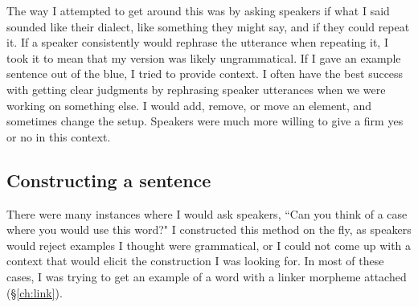 The way I attempted to get around this was by asking speakers if what I said sounded like their dialect, like something they might say, and if they could repeat it. If a speaker consistently would rephrase the utterance when repeating it, I took it to mean that my version was likely ungrammatical. If I gave an example sentence out of the blue, I tried to provide context. I often have the best success with getting clear judgments by rephrasing speaker utterances when we were working on something else. I would add, remove, or move an element, and sometimes change the setup. Speakers were much more willing to give a firm yes or no in this context.

\subsection{Constructing a sentence}

There were many instances where I would ask speakers, ``Can you think of a case where you would use this word?" I constructed this method on the fly, as speakers would reject examples I thought were grammatical, or I could not come up with a context that would elicit the construction I was looking for. In most of these cases, I was trying to get an example of a word with a linker morpheme attached (\S\ref{ch:link}).



